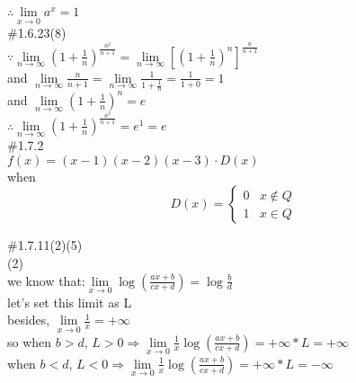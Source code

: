 \documentclass{article}
\begin{document}
$\therefore$\qquad$\lim \limits_{x \to 0}a^x=1$\\

\textcolor[rgb]{0.00,0.00,0.50}{\#1.6.23(8)}\\

$\because$\qquad$\lim \limits_{n \to \infty}\displaystyle\left(1+\frac{1}{n}\right)^{\frac{n^2}{n+1}}=\lim \limits_{n \to \infty}\left[\left(1+\frac{1}{n}\right)^n\right]^{\frac{n}{n+1}}$\\

\qquad\quad and $\lim \limits_{n \to \infty}\displaystyle\frac{n}{n+1}=\lim \limits_{n \to \infty}\frac{1}{1+\frac{1}{n}}=\frac{1}{1+0}=1$\\

\qquad\quad and $\lim \limits_{n \to \infty}\displaystyle\left(1+\frac{1}{n}\right)^n=e$\\

$\therefore$\qquad$\lim \limits_{n \to \infty}\left(1+\frac{1}{n}\right)^{\frac{n^2}{n+1}}=e^1=e$\\

\textcolor[rgb]{0.00,0.00,0.50}{\#1.7.2}\\

$f(x)=(x-1)(x-2)(x-3)\cdot D(x)$\\

when\\

$$D(x)=
\begin{cases}
0& \text{$x\notin Q$}\\
1& \text{$x\in Q$}
\end{cases}$$

\textcolor[rgb]{0.00,0.00,0.50}{\#1.7.11(2)(5)}\\

(2)\\

we know that:$\lim \limits_{x \to 0}\log\left(\displaystyle\frac{ax+b}{cx+d}\right)=\log{\displaystyle\frac{b}{d}}$\\

let's set this limit as L\\

besides, $\lim \limits_{x \to 0}\frac{1}{x}=+\infty$\\

so when $b>d$, $L>0\Rightarrow\lim \limits_{x \to 0}\displaystyle\frac{1}{x}\log\left(\displaystyle\frac{ax+b}{cx+d}\right)=+\infty*L=+\infty$\\

when $b<d$, $L<0\Rightarrow\lim \limits_{x \to 0}\displaystyle\frac{1}{x}\log\left(\displaystyle\frac{ax+b}{cx+d}\right)=+\infty*L=-\infty$\\
\end{document}
